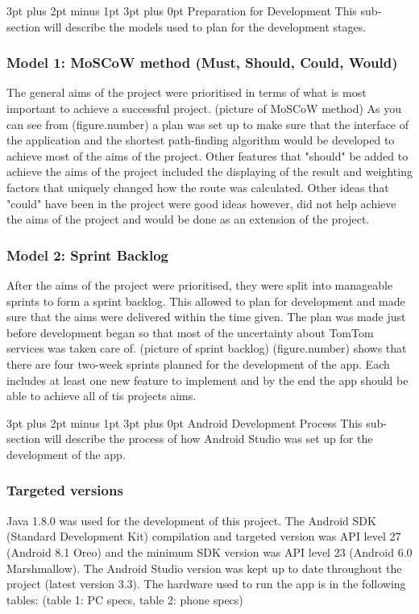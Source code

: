 \documentclass[12pt,a4paper]{article}
\makeatletter
\renewcommand\subsection{\@startsection {subsection}{1}{0mm} %
                               {3pt plus 2pt minus 1pt} %
                               {3pt plus 0pt} %
                               {\normalfont\bfseries}}
\makeatother
\begin{document}
\subsection{Preparation for Development}
This sub-section will describe the models used to plan for the development stages.

\subsubsection{Model 1: MoSCoW method (Must, Should, Could, Would)}
The general aims of the project were prioritised in terms of what is most important to achieve a successful project. (picture of MoSCoW method)
As you can see from (figure.number) a plan was set up to make sure that the interface of the application and the shortest path-finding algorithm would be developed to achieve most of the aims of the project. Other features that "should" be added to achieve the aims of the project included the displaying of the result and weighting factors that uniquely changed how the route was calculated. Other ideas that "could" have been in the project were good ideas however, did not help achieve the aims of the project and would be done as an extension of the project.

\subsubsection{Model 2: Sprint Backlog}
After the aims of the project were prioritised, they were split into manageable sprints to form a sprint backlog. This allowed to plan for development and made sure that the aims were delivered within the time given. The plan was made just before development began so that most of the uncertainty about TomTom services was taken care of. (picture of sprint backlog)
(figure.number) shows that there are four two-week sprints planned for the development of the app. Each includes at least one new feature to implement and by the end the app should be able to achieve all of tis projects aims. 

\subsection{Android Development Process}
This sub-section will describe the process of how Android Studio was set up for the development of the app.
\subsubsection{Targeted versions}
Java 1.8.0 was used for the development of this project. The Android SDK (Standard Development Kit) compilation and targeted version was API level 27 (Android 8.1 Oreo) and the minimum SDK version was API level 23 (Android 6.0 Marshmallow). The Android Studio version was kept up to date throughout the project (latest version 3.3). The hardware used to run the app is in the following tables: (table 1: PC specs, table 2: phone specs)
\end{document}
